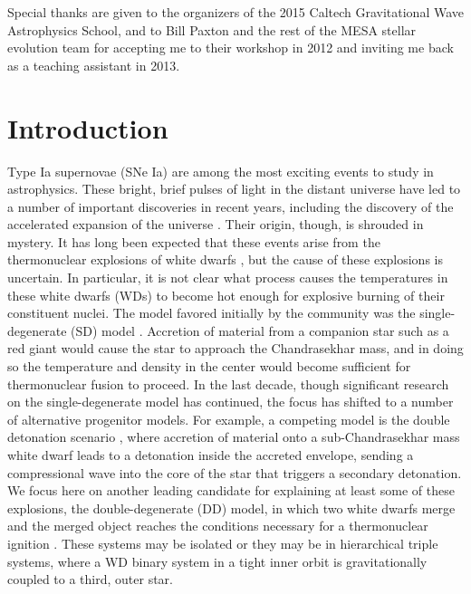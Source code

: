 \documentclass[12pt]{article}
\begin{document}
Special thanks are given to the organizers of the 2015 Caltech
Gravitational Wave Astrophysics School, and to Bill Paxton and the
rest of the MESA stellar evolution team for accepting me to their
workshop in 2012 and inviting me back as a teaching assistant in 2013.



\newpage
{}
\section{Introduction}
\label{sec:introduction}

Type Ia supernovae (SNe Ia) are among the most exciting
events to study in astrophysics. These bright, brief pulses of light
in the distant universe have led to a number of important discoveries
in recent years, including the discovery of the accelerated expansion
of the universe \citep{perlmutter1999,riess1998}. Their origin, though,
is shrouded in mystery. It has long been expected that these
events arise from the thermonuclear explosions of white dwarfs
\citep{hoyle-fowler:1960}, but the cause of these explosions is
uncertain. In particular, it is not clear what process causes the
temperatures in these white dwarfs (WDs) to become hot enough for explosive
burning of their constituent nuclei. The model favored initially by the
community was the single-degenerate (SD) model
\citep{whelan-iben:1973}. Accretion of material from a companion star
such as a red giant would cause the star to approach the Chandrasekhar
mass, and in doing so the temperature and density in the center would
become sufficient for thermonuclear fusion to proceed. In the last decade,
though significant research on the single-degenerate model has
continued, the focus has shifted to a number of alternative progenitor models.
For example, a competing model is the double detonation scenario \citep{livne:1990,woosley:1994},
where accretion of material onto a sub-Chandrasekhar mass white dwarf
leads to a detonation inside the accreted envelope, sending a compressional
wave into the core of the star that triggers a secondary detonation. We focus here
on another leading candidate for explaining at least some of these explosions,
the double-degenerate (DD) model, in which two white dwarfs merge and
the merged object reaches the conditions necessary for a thermonuclear
ignition \citep{ibentutukov:1984,webbink:1984}. These systems
may be isolated or they may be in hierarchical triple systems, where a WD binary
system in a tight inner orbit is gravitationally coupled to a third, outer star.
\end{document}
